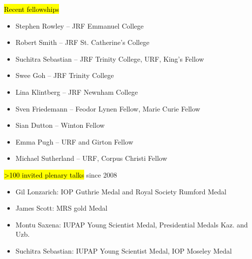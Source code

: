 \begin{frame}[label=ResearchSuccess]
\hl{Recent fellowships}
\begin{small}
\begin{itemize}
\addtolength{\itemsep}{-0.3\baselineskip}
\item Stephen Rowley -- JRF Emmanuel College
\item Robert Smith -- JRF St. Catherine's College
\item Suchitra Sebastian -- JRF Trinity College, URF, King's Fellow
\item Swee Goh -- JRF Trinity College
\item Lina Klintberg -- JRF Newnham College
\item Sven Friedemann -- Feodor Lynen Fellow, Marie Curie Fellow
\item Sian Dutton -- Winton Fellow
\item Emma Pugh -- URF and Girton Fellow
\item Michael Sutherland -- URF, Corpus Christi Fellow
\end{itemize}
\end{small}



\hl{>100 invited plenary talks} since 2008
\begin{small}
\begin{itemize}
\addtolength{\itemsep}{-0.3\baselineskip}
\item
Gil Lonzarich: IOP Guthrie Medal and Royal Society Rumford Medal
\item
James Scott: MRS gold Medal
\item
Montu Saxena: IUPAP Young Scientist Medal, Presidential Medals Kaz. and Uzb.
\item 
Suchitra Sebastian: IUPAP Young Scientist Medal, IOP Moseley Medal
\end{itemize}
\end{small}
\end{frame}

